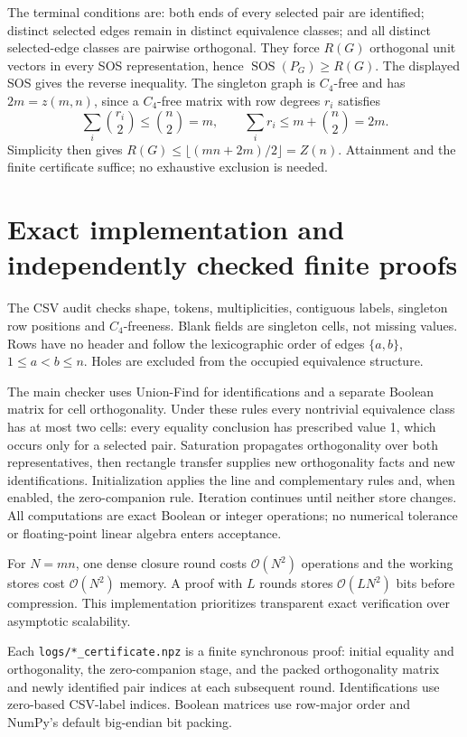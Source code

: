 \documentclass[11pt]{article}
\begin{document}
The terminal conditions are: both ends of every selected pair are identified;
distinct selected edges remain in distinct equivalence classes; and all
distinct selected-edge classes are pairwise orthogonal. They force $R(G)$
orthogonal unit vectors in every SOS representation, hence
$\operatorname{SOS}(P_G)\ge R(G)$. The displayed SOS gives the reverse inequality.
The singleton graph is $C_4$-free and has $2m=z(m,n)$, since a $C_4$-free
matrix with row degrees $r_i$ satisfies
\[
 \sum_i\binom{r_i}{2}\le\binom n2=m,\qquad
 \sum_i r_i\le m+\binom n2=2m.
\]
Simplicity then gives $R(G)\le\lfloor(mn+2m)/2\rfloor=Z(n)$. Attainment and
the finite certificate suffice; no exhaustive exclusion is needed.

\newpage
\section{Exact implementation and independently checked finite proofs}
The CSV audit checks shape, tokens, multiplicities, contiguous labels,
singleton row positions and $C_4$-freeness. Blank fields are singleton cells,
not missing values. Rows have no header and follow the lexicographic order
of edges $\{a,b\}$, $1\le a<b\le n$. Holes are excluded from the occupied
equivalence structure.

The main checker uses Union-Find for identifications and a separate Boolean
matrix for cell orthogonality. Under these rules every nontrivial equivalence
class has at most two cells: every equality conclusion has prescribed value 1,
which occurs only for a selected pair. Saturation propagates orthogonality
over both representatives, then rectangle transfer supplies new orthogonality
facts and new identifications. Initialization applies the line and
complementary rules and, when enabled, the zero-companion rule. Iteration
continues until neither store changes. All computations are exact Boolean
or integer operations; no numerical tolerance or floating-point linear
algebra enters acceptance.

For $N=mn$, one dense closure round costs $\mathcal O(N^2)$ operations and
the working stores cost $\mathcal O(N^2)$ memory. A proof with $L$ rounds
stores $\mathcal O(LN^2)$ bits before compression. This implementation
prioritizes transparent exact verification over asymptotic scalability.

Each \texttt{logs/*\_certificate.npz} is a finite synchronous proof: initial
equality and orthogonality, the zero-companion stage, and the packed
orthogonality matrix and newly identified pair indices at each subsequent
round. Identifications use zero-based CSV-label indices. Boolean matrices
use row-major order and NumPy's default big-endian bit packing.
\end{document}
